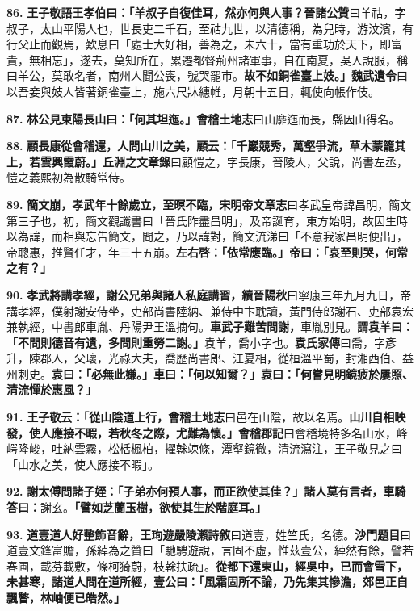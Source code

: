 \textbf{86.} \textbf{王子敬語王孝伯曰：「羊叔子自復佳耳，然亦何與人事？}{\footnotesize \textbf{晉諸公贊}曰羊祜，字叔子，太山平陽人也，世長吏二千石，至祜九世，以清德稱，為兒時，游汶濱，有行父止而觀焉，歎息曰「處士大好相，善為之，未六十，當有重功於天下，即富貴，無相忘」，遂去，莫知所在，累遷都督荊州諸軍事，自在南夏，吳人說服，稱曰羊公，莫敢名者，南州人聞公喪，號哭罷市。}\textbf{故不如銅雀臺上妓。」}{\footnotesize \textbf{魏武遺令}曰以吾妾與妓人皆著銅雀臺上，施六尺牀繐帷，月朝十五日，輒使向帳作伎。}

\textbf{87.} \textbf{林公見東陽長山曰：「何其坦迤。」}{\footnotesize \textbf{會稽土地志}曰山靡迤而長，縣因山得名。}

\textbf{88.} \textbf{顧長康從會稽還，人問山川之美，顧云：「千巖競秀，萬壑爭流，草木蒙籠其上，若雲興霞蔚。」}{\footnotesize \textbf{丘淵之文章錄}曰顧愷之，字長康，晉陵人，父說，尚書左丞，愷之義熙初為散騎常侍。}

\textbf{89.} \textbf{簡文崩，孝武年十餘歲立，至暝不臨，}{\footnotesize \textbf{宋明帝文章志}曰孝武皇帝諱昌明，簡文第三子也，初，簡文觀讖書曰「晉氏阼盡昌明」，及帝誕育，東方始明，故因生時以為諱，而相與忘告簡文，問之，乃以諱對，簡文流涕曰「不意我家昌明便出」，帝聰惠，推賢任才，年三十五崩。}\textbf{左右啓：「依常應臨。」帝曰：「哀至則哭，何常之有？」}

\textbf{90.} \textbf{孝武將講孝經，謝公兄弟與諸人私庭講習，}{\footnotesize \textbf{續晉陽秋}曰寧康三年九月九日，帝講孝經，僕射謝安侍坐，吏部尚書陸納、兼侍中卞耽讀，黃門侍郎謝石、吏部袁宏兼執經，中書郎車胤、丹陽尹王溫摘句。}\textbf{車武子難苦問謝，}{\footnotesize 車胤別見。}\textbf{謂袁羊曰：「不問則德音有遺，多問則重勞二謝。」}{\footnotesize 袁羊，喬小字也。\textbf{袁氏家傳}曰喬，字彥升，陳郡人，父瓌，光祿大夫，喬歷尚書郎、江夏相，從桓溫平蜀，封湘西伯、益州刺史。}\textbf{袁曰：「必無此嫌。」車曰：「何以知爾？」袁曰：「何嘗見明鏡疲於屢照、清流憚於惠風？」}

\textbf{91.} \textbf{王子敬云：「從山陰道上行，}{\footnotesize \textbf{會稽土地志}曰邑在山陰，故以名焉。}\textbf{山川自相映發，使人應接不暇，若秋冬之際，尤難為懷。」}{\footnotesize \textbf{會稽郡記}曰會稽境特多名山水，峰崿隆峻，吐納雲霧，松栝楓柏，擢榦竦條，潭壑鏡徹，清流瀉注，王子敬見之曰「山水之美，使人應接不暇」。}

\textbf{92.} \textbf{謝太傅問諸子姪：「子弟亦何預人事，而正欲使其佳？」諸人莫有言者，車騎答曰：}{\footnotesize 謝玄。}\textbf{「譬如芝蘭玉樹，欲使其生於階庭耳。」}

\textbf{93.} \textbf{道壹道人好整飾音辭，}{\footnotesize \textbf{王珣遊嚴陵瀨詩敘}曰道壹，姓竺氏，名德。\textbf{沙門題目}曰道壹文鋒富贍，孫綽為之贊曰「馳騁遊說，言固不虛，惟茲壹公，綽然有餘，譬若春圃，載芬載敷，條柯猗蔚，枝榦扶疏」。}\textbf{從都下還東山，經吳中，已而會雪下，未甚寒，諸道人問在道所經，壹公曰：「風霜固所不論，乃先集其慘澹，郊邑正自飄瞥，林岫便已皓然。」}

